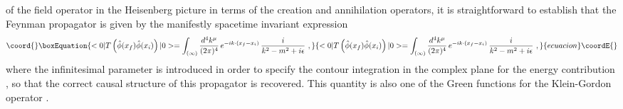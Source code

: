 \documentclass[a4paper,11pt]{article}
\begin{document}
of the field operator in the Heisenberg
picture in terms of the creation and annihilation operators, it is
straightforward to establish that the Feynman propagator is given by the
manifestly spacetime invariant expression
\begin{equation}\coord{}\boxEquation{
<0|T\left(\hat{\phi}(x_f)\hat{\phi}(x_i)\right)|0>=
\int_{(\infty)}\frac{d^4k^\mu}{(2\pi)^4}\,e^{-ik\cdot(x_f-x_i)}\,
\frac{i}{k^2-m^2+i\epsilon}\ ,
\label{eq:Feynmanpropagator}
}{
<0|T\left(\hat{\phi}(x_f)\hat{\phi}(x_i)\right)|0>=
\int_{(\infty)}\frac{d^4k^\mu}{(2\pi)^4}\,e^{-ik\cdot(x_f-x_i)}\,
\frac{i}{k^2-m^2+i\epsilon}\ ,
}{ecuacion}\coordE{}\end{equation}
where the infinitesimal parameter \coordHE{} is introduced in order
to specify the contour integration in the complex plane for the
energy contribution \coordHE{}, so that the correct causal structure of this 
propagator is recovered. This quantity is also one of the Green
functions for the Klein-Gordon operator \coordHE{}.

\vspace{5pt}
\end{document}
